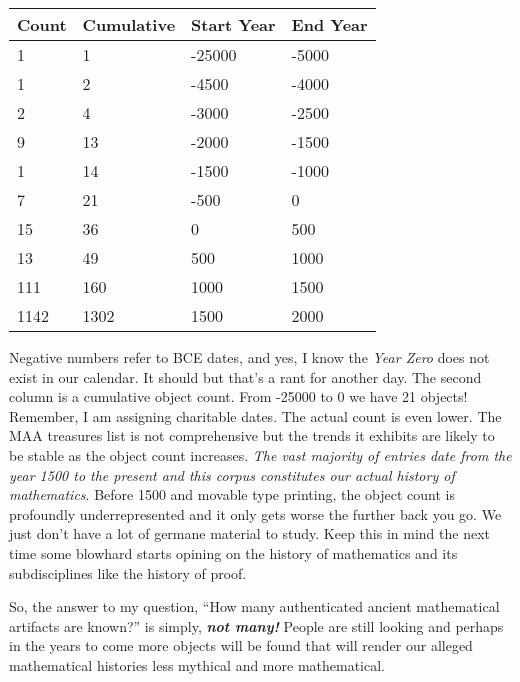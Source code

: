 \begin{longtable}[]{@{}llll@{}}
\toprule
Count & Cumulative & Start Year & End Year \\
\midrule
\endhead
1 & 1 & -25000 & -5000 \\
1 & 2 & -4500 & -4000 \\
2 & 4 & -3000 & -2500 \\
9 & 13 & -2000 & -1500 \\
1 & 14 & -1500 & -1000 \\
7 & 21 & -500 & 0 \\
15 & 36 & 0 & 500 \\
13 & 49 & 500 & 1000 \\
111 & 160 & 1000 & 1500 \\
1142 & 1302 & 1500 & 2000 \\
\bottomrule
\end{longtable}

Negative numbers refer to BCE dates, and yes, I know the \emph{Year
Zero} does not exist in our calendar. It should but that's a rant for
another day. The second column is a cumulative object count. From -25000
to 0 we have 21 objects! Remember, I am assigning charitable dates. The
actual count is even lower. The MAA treasures list is not comprehensive
but the trends it exhibits are likely to be stable as the object count
increases. \emph{The vast majority of entries date from the year 1500 to
the present and this corpus constitutes our actual history of
mathematics}. Before 1500 and movable type printing, the object count is
profoundly underrepresented and it only gets worse the further back you
go. We just don't have a lot of germane material to study. Keep this in
mind the next time some blowhard starts opining on the history of
mathematics and its subdisciplines like the history of proof.

So, the answer to my question, ``How many authenticated ancient
mathematical artifacts are known?'' is simply, \textbf{\emph{not many!}}
People are still looking and perhaps in the years to come more objects
will be found that will render our alleged mathematical histories less
mythical and more mathematical.

